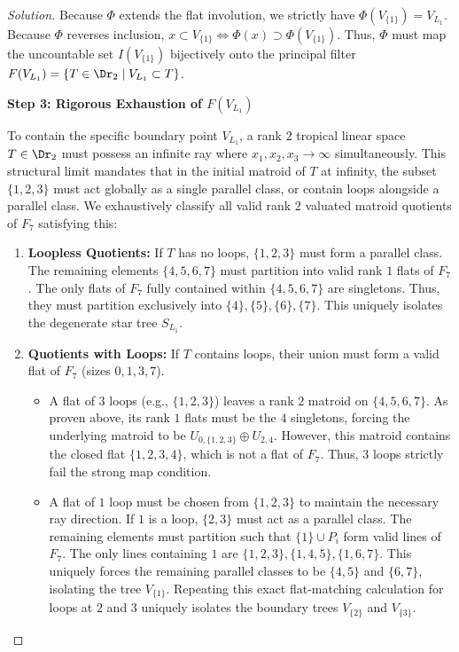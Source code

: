 \begin{proof}[Solution]
Because $\Phi$ extends the flat involution, we strictly have $\Phi(V_{\{1\}}) = V_{L_1}$. Because $\Phi$ reverses inclusion, $x \subset V_{\{1\}} \iff \Phi(x) \supset \Phi(V_{\{1\}})$. Thus, $\Phi$ must map the uncountable set $I(V_{\{1\}})$ bijectively onto the principal filter $F(V_{L_1}) = \{ T \in \Dr_2 \mid V_{L_1} \subset T \}$.

\medskip
\noindent \textbf{Step 3: Rigorous Exhaustion of $F(V_{L_1})$}

To contain the specific boundary point $V_{L_1}$, a rank $2$ tropical linear space $T \in \Dr_2$ must possess an infinite ray where $x_1, x_2, x_3 \to \infty$ simultaneously. This structural limit mandates that in the initial matroid of $T$ at infinity, the subset $\{1,2,3\}$ must act globally as a single parallel class, or contain loops alongside a parallel class. We exhaustively classify all valid rank $2$ valuated matroid quotients of $F_7$ satisfying this:

\begin{enumerate}
    \item \textbf{Loopless Quotients:} If $T$ has no loops, $\{1,2,3\}$ must form a parallel class. The remaining elements $\{4,5,6,7\}$ must partition into valid rank $1$ flats of $F_7$. The only flats of $F_7$ fully contained within $\{4,5,6,7\}$ are singletons. Thus, they must partition exclusively into $\{4\}, \{5\}, \{6\}, \{7\}$. This uniquely isolates the degenerate star tree $S_{L_1}$.
    \item \textbf{Quotients with Loops:} If $T$ contains loops, their union must form a valid flat of $F_7$ (sizes $0, 1, 3, 7$). 
    \begin{itemize}
        \item A flat of $3$ loops (e.g., $\{1,2,3\}$) leaves a rank $2$ matroid on $\{4,5,6,7\}$. As proven above, its rank $1$ flats must be the $4$ singletons, forcing the underlying matroid to be $U_{0,\{1,2,3\}} \oplus U_{2,4}$. However, this matroid contains the closed flat $\{1,2,3,4\}$, which is not a flat of $F_7$. Thus, $3$ loops strictly fail the strong map condition.
        \item A flat of $1$ loop must be chosen from $\{1,2,3\}$ to maintain the necessary ray direction. If $1$ is a loop, $\{2,3\}$ must act as a parallel class. The remaining elements must partition such that $\{1\} \cup P_i$ form valid lines of $F_7$. The only lines containing $1$ are $\{1,2,3\}, \{1,4,5\}, \{1,6,7\}$. This uniquely forces the remaining parallel classes to be $\{4,5\}$ and $\{6,7\}$, isolating the tree $V_{\{1\}}$. Repeating this exact flat-matching calculation for loops at $2$ and $3$ uniquely isolates the boundary trees $V_{\{2\}}$ and $V_{\{3\}}$.
    \end{itemize}
\end{enumerate}


\end{proof}
